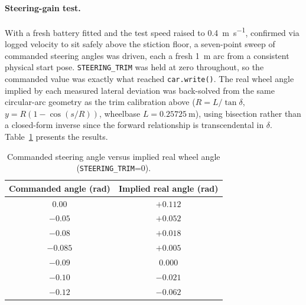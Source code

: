 \paragraph{Steering-gain test.} With a fresh battery fitted and
the test speed raised to \SI{0.4}{\meter\per\second}, confirmed via
logged velocity to sit safely above the stiction floor, a seven-point
sweep of commanded steering angles was driven, each a fresh
\SI{1}{\meter} arc from a consistent physical start pose.
\texttt{STEERING\_TRIM} was held at zero throughout, so the commanded
value was exactly what reached \texttt{car.write()}. The real wheel angle implied by
each measured lateral deviation was back-solved from the same
circular-arc geometry as the trim calibration above
($R = L/\tan\delta$, $y = R(1-\cos(s/R))$, wheelbase
$L=\SI{0.25725}{\meter}$), using bisection rather than a closed-form
inverse since the forward relationship is transcendental in $\delta$.
Table~\ref{tab:steering-gain-sweep} presents the results.

\begin{table}[htbp]
  \centering
  \caption{Commanded steering angle versus implied real wheel angle (\texttt{STEERING\_TRIM}=0).}
  \label{tab:steering-gain-sweep}
  \begin{tabular}{@{}cc@{}}
    \toprule
    Commanded angle (rad) & Implied real angle (rad) \\
    \midrule
    $0.00$ & $+0.112$ \\
    $-0.05$ & $+0.052$ \\
    $-0.08$ & $+0.018$ \\
    $-0.085$ & $+0.005$ \\
    $-0.09$ & $0.000$ \\
    $-0.10$ & $-0.021$ \\
    $-0.12$ & $-0.062$ \\
    \bottomrule
  \end{tabular}
\end{table}

